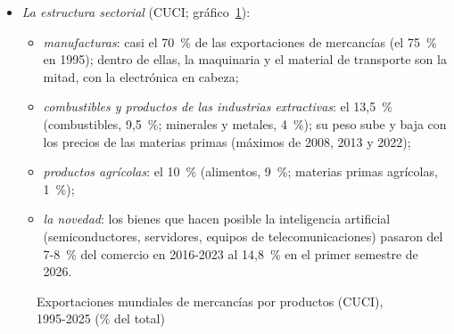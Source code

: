\documentclass[11pt]{article}
\begin{document}
\begin{itemize}
\item \emph{La estructura sectorial} (CUCI; gráfico~\ref{fig:comercio-productos})\nocite{BM2026WDIProductos}:
  \begin{itemize}
  \item \emph{manufacturas}: casi el 70~\% de las exportaciones de mercancías (el 75~\% en 1995); dentro de ellas, la maquinaria y el material de transporte son la mitad, con la electrónica en cabeza;
  \item \emph{combustibles y productos de las industrias extractivas}: el 13,5~\% (combustibles, 9,5~\%; minerales y metales, 4~\%); su peso sube y baja con los precios de las materias primas (máximos de 2008, 2013 y 2022)\nocite{BM2026WDIProductos};
  \item \emph{productos agrícolas}: el 10~\% (alimentos, 9~\%; materias primas agrícolas, 1~\%);
  \item \emph{la novedad}: los bienes que hacen posible la inteligencia artificial (semiconductores, servidores, equipos de telecomunicaciones) pasaron del 7-8~\% del comercio en 2016-2023 al 14,8~\% en el primer semestre de 2026\nocite{OMC2026PerspectivasOct}.
  \end{itemize}
\end{itemize}

\begin{figure}[H]
\centering
\caption{Exportaciones mundiales de mercancías por productos (CUCI), 1995-2025 (\% del total)}\label{fig:comercio-productos}
\end{figure}
\end{document}
